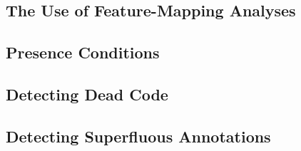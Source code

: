
\subsection{The Use of Feature-Mapping Analyses}




\subsection{Presence Conditions}

\begin{frame}{\myframetitle}
	\begin{mycolumns}
	\mynextcolumn
	\end{mycolumns}
\end{frame}

\subsection{Detecting Dead Code}


\begin{frame}{\myframetitle}
	\begin{mycolumns}
	\mynextcolumn
	\end{mycolumns}
\end{frame}

\subsection{Detecting Superfluous Annotations}


\begin{frame}{\myframetitle}
	\begin{mycolumns}
	\mynextcolumn
	\end{mycolumns}
\end{frame}

